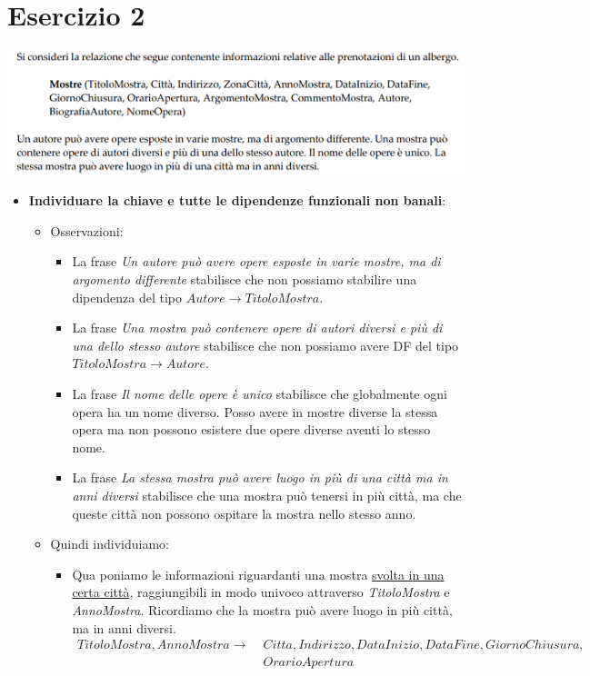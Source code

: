 \section{Esercizio 2}
\begin{center}
	\includegraphics{images/223.PNG}
\end{center}
\begin{itemize}
	\item \textbf{Individuare la chiave e tutte le dipendenze funzionali non banali}:
	\begin{itemize}
		\item Osservazioni:
		\begin{itemize}
			\item La frase \emph{Un autore può avere opere esposte in varie mostre, ma di argomento differente} stabilisce che non possiamo stabilire una dipendenza del tipo $Autore \to TitoloMostra$.
			\item La frase \emph{Una mostra può contenere opere di autori diversi e più di una dello stesso autore} stabilisce che non possiamo avere DF del tipo $TitoloMostra \to Autore$.
			\item La frase \emph{Il nome delle opere è unico} stabilisce che globalmente ogni opera ha un nome diverso. Posso avere in mostre diverse la stessa opera ma non possono esistere due opere diverse aventi lo stesso nome.
			\item La frase \emph{La stessa mostra può avere luogo in più di una città ma in anni diversi} stabilisce che una mostra può tenersi in più città, ma che queste città non possono ospitare la mostra nello stesso anno.
		\end{itemize}
		\item Quindi individuiamo:
		\begin{itemize}
			\item Qua poniamo le informazioni riguardanti una mostra \underline{svolta in una certa città}, raggiungibili in modo univoco attraverso \emph{TitoloMostra} e \emph{AnnoMostra}. Ricordiamo che la mostra può avere luogo in più città, ma in anni diversi.
			\begin{align*}TitoloMostra, AnnoMostra \to\;& Citta, Indirizzo, DataInizio, DataFine, GiornoChiusura,\\&OrarioApertura\end{align*}

\end{itemize}
\end{itemize}
\end{itemize}
